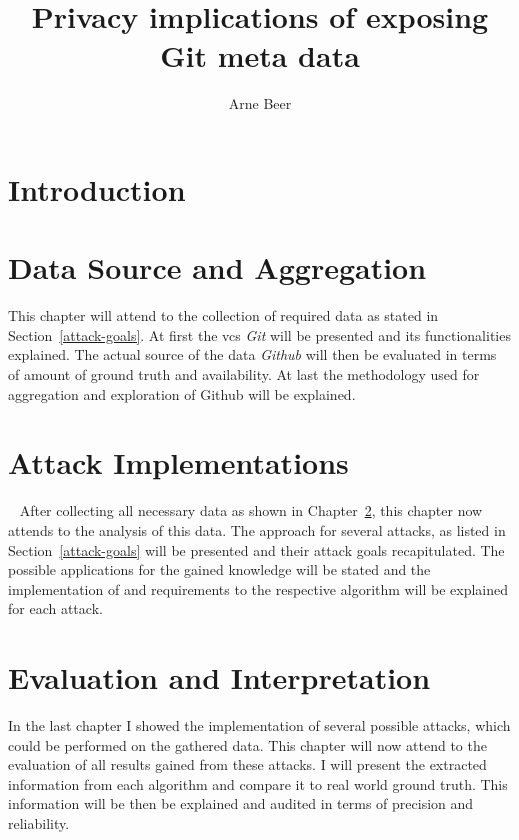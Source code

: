 \documentclass{thesis}
\title{Privacy implications of exposing Git meta data}
\author{Arne Beer}
\begin{document}

\cleardoublepage{}


\clearpage



{\small \tableofcontents}



\chapter{Introduction}




\chapter{Data Source and Aggregation}\label{data}
This chapter will attend to the collection of required data as stated in Section~\ref{attack-goals}.
At first the \ac{vcs} \emph{Git} will be presented and its functionalities explained.
The actual source of the data \emph{Github} will then be evaluated in terms of amount of ground truth and availability.
At last the methodology used for aggregation and exploration of Github will be explained.








\chapter{Attack Implementations}~\label{implementation}
After collecting all necessary data as shown in Chapter~\ref{data}, this chapter now attends to the analysis of this data.
The approach for several attacks, as listed in Section~\ref{attack-goals} will be presented and their attack goals recapitulated.
The possible applications for the gained knowledge will be stated and the implementation of and requirements to the respective algorithm will be explained for each attack.







\chapter{Evaluation and Interpretation}\label{evaluation}
In the last chapter I showed the implementation of several possible attacks, which could be performed on the gathered data.
This chapter will now attend to the evaluation of all results gained from these attacks.
I will present the extracted information from each algorithm and compare it to real world ground truth.
This information will be then be explained and audited in terms of precision and reliability.
\end{document}
